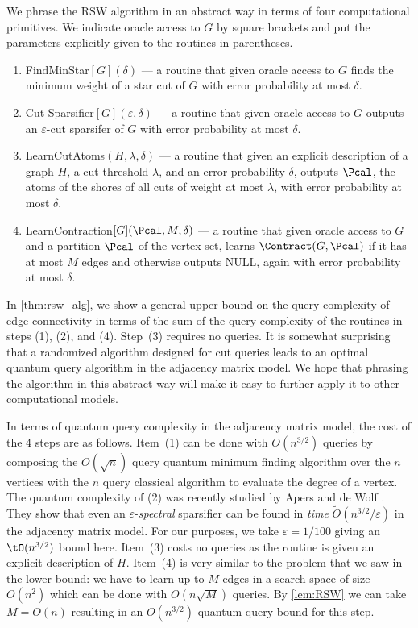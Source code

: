 We phrase the RSW algorithm in an abstract way in terms of four computational primitives.  We indicate oracle access to $G$ by square brackets and put the 
parameters explicitly given to the routines in parentheses.
\begin{enumerate}
  \item FindMinStar$[G](\delta)$ --- a routine that given oracle access to $G$ finds the minimum weight of a star cut of $G$ with error probability at most $\delta$.
  \item Cut-Sparsifier$[G](\varepsilon, \delta)$ --- a routine that given oracle access to $G$ outputs an $\varepsilon$-cut sparsifer of $G$ with error probability at most $\delta$.
  \item LearnCutAtoms$(H, \lambda, \delta)$ --- a routine that given an explicit description of a graph $H$, a cut threshold $\lambda$, and an error probability $\delta$, 
  outputs $\Pcal$, the atoms of the shores of all cuts of weight at most $\lambda$, with error probability at most $\delta$.
  \item LearnContraction$[G](\Pcal, M, \delta)$ --- a routine that given oracle access to $G$ and a partition $\Pcal$ of the vertex set, learns $\Contract(G,\Pcal)$ if it has at most $M$ 
  edges and otherwise outputs NULL, again with error probability at most $\delta$.
\end{enumerate}
In \cref{thm:rsw_alg}, we show a general upper bound on the query complexity of edge connectivity in terms of the sum of the query complexity of the routines in steps (1), (2), and (4).  Step~(3) 
requires no queries.  It is somewhat surprising that a randomized algorithm designed for cut queries leads to an optimal quantum query algorithm in the adjacency matrix model.  We hope that phrasing 
the algorithm in this abstract way will make it easy to further apply it to other computational models.

In terms of quantum query complexity in the adjacency matrix model, the cost of the 4 steps are as follows.
Item~(1) can be done with $O(n^{3/2})$ queries by composing the $O(\sqrt{n})$ query quantum minimum finding algorithm over the $n$ vertices with the $n$ query classical algorithm to evaluate the degree of 
a vertex.  The quantum complexity of (2) was recently studied by Apers and de Wolf \cite{AdW19}.  They 
show that even an $\varepsilon$-\textit{spectral} sparsifier can be found in \emph{time} $\tilde O(n^{3/2}/\varepsilon)$ in the adjacency matrix 
model.  For our purposes, we take $\varepsilon=1/100$ giving an $\tO(n^{3/2})$ bound here. Item~(3) costs no queries as the routine is given an explicit description of $H$.  Item~(4) is very similar to the 
problem that we saw in the lower bound: we have to learn up to $M$ edges in a search space of size $O(n^2)$ which can be done with $O(n \sqrt{M})$ queries.  By \cref{lem:RSW}
we can take $M = O(n)$ resulting in an $O(n^{3/2})$ quantum query bound for this step.

